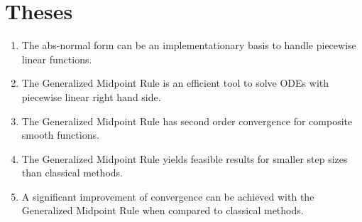 \chapter{Theses}
\begin{enumerate}
	\item The abs-normal form can be an implementationary basis to handle piecewise linear functions.
	\item The Generalized Midpoint Rule is an efficient tool to solve ODEs with piecewise linear right hand side.
	\item The Generalized Midpoint Rule has second order convergence for composite smooth functions.
	\item The Generalized Midpoint Rule yields feasible results for smaller step sizes than classical methods.
	\item A significant improvement of convergence can be achieved with the Generalized Midpoint Rule when compared to classical methods.
\end{enumerate}